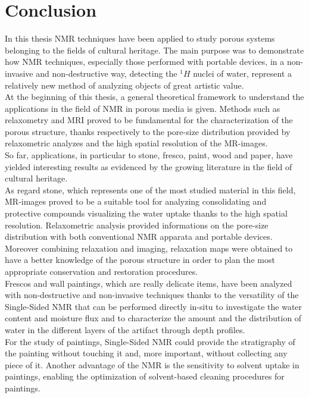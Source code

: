 \documentclass[a4paper,11pt]{report}
\begin{document}
\chapter{Conclusion}
In this thesis NMR techniques have been applied to study porous systems belonging to the fields of cultural heritage.
The main purpose was to demonstrate how NMR techniques, especially those performed with portable devices, in a non-invasive and non-destructive way, detecting the $^1H$ nuclei of water, represent a relatively new method of analyzing objects of great artistic value.\\ 
At the beginning of this thesis, a general theoretical framework to understand the applications in the field of NMR in porous media is given. Methods such as relaxometry and MRI proved to be fundamental for the characterization of the porous structure, thanks respectively to the pore-size distribution provided by relaxometric analyzes and the high spatial resolution of the MR-images. \\
So far, applications, in particular to stone, fresco, paint, wood and paper, have yielded interesting results as evidenced by the growing literature in the field of cultural heritage.\\
As regard stone, which represents one of the most studied material in this field, MR-images proved to be a suitable tool for analyzing consolidating and protective compounds visualizing the water uptake thanks to the high spatial resolution. Relaxometric analysis provided informations on the pore-size distribution with both conventional NMR apparata and portable devices. Moreover combining relaxation and imaging, relaxation maps were obtained to have a better knowledge of the porous structure in order to plan the most appropriate conservation and restoration procedures.  \\
Frescos and wall paintings, which are really delicate items, have been analyzed with non-destructive and non-invasive techniques thanks to the versatility of the Single-Sided NMR that can be performed directly in-situ to investigate the water content and moisture flux and to characterize the amount and the distribution of water in the different layers of the artifact through depth profiles.\\
For the study of paintings, Single-Sided NMR could provide the stratigraphy of the painting without touching it and, more important, without collecting any piece of it. Another advantage of the NMR is the sensitivity to solvent uptake in paintings, enabling the optimization of solvent-based cleaning procedures for paintings.\\
\end{document}
